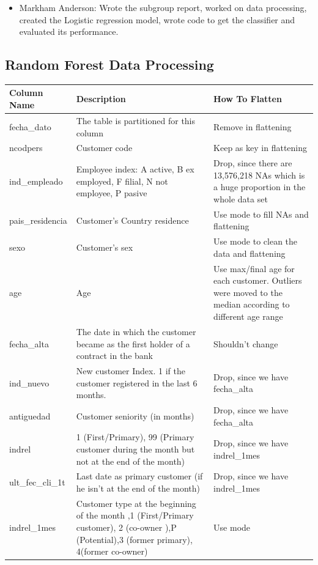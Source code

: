 \documentclass{article}
\begin{document}
\begin{spacing}{1}
\begin{large}
\begin{itemize}
	\item Markham Anderson: Wrote the subgroup report, worked on data processing, created the Logistic regression model, wrote code to get the classifier and evaluated its performance.
\end{itemize}

\newpage

\begin{appendices}

	\section{Random Forest Data Processing}
	\label{appendix:rn_data}
	\begin{longtable}{p{3cm}|p{5cm}|p{5cm}}
		Column Name & Description & How To Flatten  \\
		\hline
		fecha\_dato & The table is partitioned for this column & Remove in flattening \\
		ncodpers & Customer code & Keep as key in flattening \\
		ind\_empleado & Employee index: A active, B ex employed, F filial, N not employee, P pasive & Drop, since there are 13,576,218 NAs which is a huge proportion in the whole data set \\
		pais\_residencia & Customer's Country residence & Use mode to fill NAs and flattening\\
		sexo & Customer's sex & Use mode to clean the data and flattening\\
		age & Age & Use max/final age for each customer. Outliers were moved to the median according to different age range \\
		fecha\_alta & The date in which the customer became as the first holder of a contract in the bank & Shouldn't change \\
		ind\_nuevo & New customer Index. 1 if the customer registered in the last 6 months. & Drop, since we have fecha\_alta \\
		antiguedad & Customer seniority (in months) & Drop, since we have fecha\_alta \\
		indrel & 1 (First/Primary), 99 (Primary customer during the month but not at the end of the month) & Drop, since we have indrel\_1mes \\
		ult\_fec\_cli\_1t & Last date as primary customer (if he isn't at the end of the month) & Drop, since we have indrel\_1mes \\
		indrel\_1mes & Customer type at the beginning of the month ,1 (First/Primary customer), 2 (co-owner ),P (Potential),3 (former primary), 4(former co-owner) & Use mode \\

\end{longtable}
\end{appendices}
\end{large}
\end{spacing}
\end{document}

